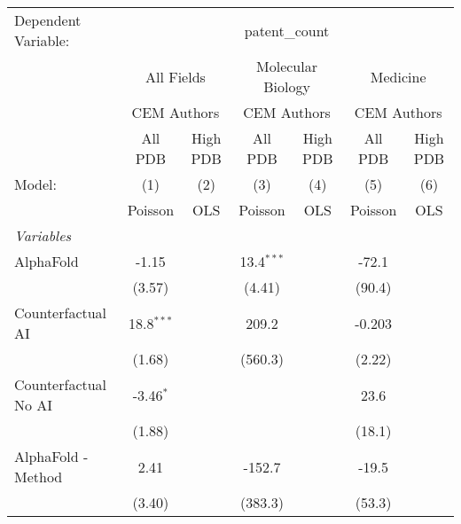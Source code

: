 \begingroup
\centering
\begin{tabular}{lcccccc}
   \tabularnewline \midrule \midrule
   Dependent Variable: & \multicolumn{6}{c}{patent\_count}\\
 & \multicolumn{2}{c}{All Fields} & \multicolumn{2}{c}{Molecular Biology} & \multicolumn{2}{c}{Medicine} \\
\cmidrule(lr){2-3} \cmidrule(lr){4-5} \cmidrule(lr){6-7}
 & \multicolumn{2}{c}{CEM Authors} & \multicolumn{2}{c}{CEM Authors} & \multicolumn{2}{c}{CEM Authors} \\
\cmidrule(lr){2-3} \cmidrule(lr){4-5} \cmidrule(lr){6-7}
 & \multicolumn{1}{c}{All PDB} & \multicolumn{1}{c}{High PDB} & \multicolumn{1}{c}{All PDB} & \multicolumn{1}{c}{High PDB} & \multicolumn{1}{c}{All PDB} & \multicolumn{1}{c}{High PDB} \\
\cmidrule(lr){2-2} \cmidrule(lr){3-3} \cmidrule(lr){4-4} \cmidrule(lr){5-5} \cmidrule(lr){6-6} \cmidrule(lr){7-7}
   Model:                                                     & (1)           & (2)  & (3)          & (4)  & (5)     & (6)\\  
                                                              &  Poisson      & OLS  & Poisson      & OLS  & Poisson & OLS\\  
   \midrule
   \emph{Variables}\\
   AlphaFold                                                  & -1.15         &      & 13.4$^{***}$ &      & -72.1   &   \\   
                                                              & (3.57)        &      & (4.41)       &      & (90.4)  &   \\   
   Counterfactual AI                                          & 18.8$^{***}$  &      & 209.2        &      & -0.203  &   \\   
                                                              & (1.68)        &      & (560.3)      &      & (2.22)  &   \\   
   Counterfactual No AI                                       & -3.46$^{*}$   &      &              &      & 23.6    &   \\   
                                                              & (1.88)        &      &              &      & (18.1)  &   \\   
   AlphaFold - Method                                         & 2.41          &      & -152.7       &      & -19.5   &   \\   
                                                              & (3.40)        &      & (383.3)      &      & (53.3)  &   \\   

\end{tabular}
